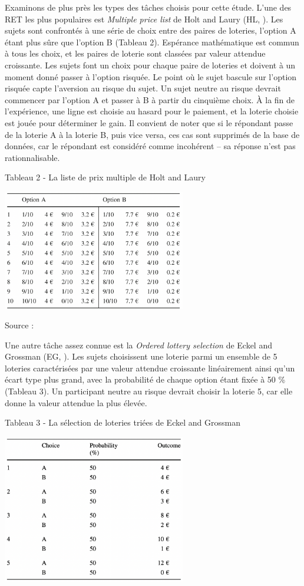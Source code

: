 \documentclass[12pt]{article}
\begin{document}
Examinons de plus près les types des tâches choisis pour cette étude.
L'une des RET les plus populaires est \emph{Multiple price list} de Holt
and Laury (HL, \citet{Holt2002}). Les sujets sont confrontés à une série
de choix entre des paires de loteries, l'option A étant plus sûre que
l'option B (Tableau 2). Espérance mathématique est commun à tous les
choix, et les paires de loterie sont classées par valeur attendue
croissante. Les sujets font un choix pour chaque paire de loteries et
doivent à un moment donné passer à l'option risquée. Le point où le
sujet bascule sur l'option risquée capte l'aversion au risque du sujet.
Un sujet neutre au risque devrait commencer par l'option A et passer à B
à partir du cinquième choix. À la fin de l'expérience, une ligne est
choisie au hasard pour le paiement, et la loterie choisie est jouée pour
déterminer le gain. Il convient de noter que si le répondant passe de la
loterie A à la loterie B, puis vice versa, ces cas sont supprimés de la
base de données, car le répondant est considéré comme incohérent -- sa
réponse n'est pas rationnalisable.

Tableau 2 - La liste de prix multiple de Holt and Laury

\hfil \includegraphics[width=0.6\textwidth,height=0.3\textheight]{HL.png}
\hfil

Source : \citet{Holt2002}

Une autre tâche assez connue est la \emph{Ordered lottery selection} de
Eckel and Grossman (EG, \citet{Eckel2002}). Les sujets choisissent une
loterie parmi un ensemble de 5 loteries caractérisées par une valeur
attendue croissante linéairement ainsi qu'un écart type plus grand, avec
la probabilité de chaque option étant fixée à 50 \% (Tableau 3). Un
participant neutre au risque devrait choisir la loterie 5, car elle
donne la valeur attendue la plus élevée.

Tableau 3 - La sélection de loteries triées de Eckel and Grossman

\hfil \includegraphics[width=0.6\textwidth,height=0.3\textheight]{EG.png}
\hfil
\end{document}
